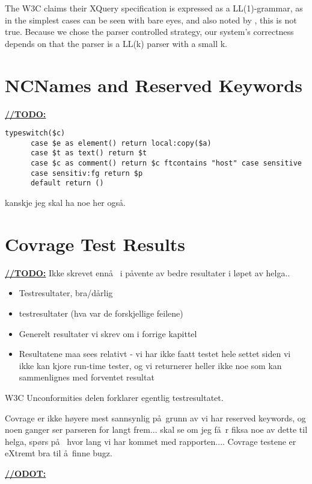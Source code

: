 The W3C claims their XQuery specification is expressed as a LL(1)-grammar\cite{createTokenizer}, as in the simplest cases can be seen with bare eyes, and also noted by \cite{kang_xquery_diglib}, this is not true. Because we chose the parser controlled strategy, our system's correctness depends on that the parser is a LL(k) parser with a small k.

\section{NCNames and Reserved Keywords}
\underline{\textbf{\LARGE //TODO:}}
\begin{verbatim}
typeswitch($c) 
      case $e as element() return local:copy($a)
      case $t as text() return $t
      case $c as comment() return $c ftcontains "host" case sensitive
      case sensitiv:fg return $p
      default return ()
\end{verbatim}


kanskje jeg skal ha noe her ogs\aa .


\section{Covrage Test Results}
\label{sect:discussion:coverageResults}
\underline{\textbf{\LARGE //TODO:}} Ikke skrevet enn\aa~ i p\aa vente av bedre resultater i l\o pet av helga..
\begin{itemize}
\item Testresultater, bra/d\aa rlig
\item testresultater (hva var de forskjellige feilene)
\item Generelt resultater vi skrev om i forrige kapittel
\item Resultatene maa sees relativt - vi har ikke faatt testet hele settet siden
vi ikke kan kjore run-time tester, og vi returnerer heller ikke noe som kan
sammenlignes med forventet resultat
\end{itemize}

W3C Unconformities delen forklarer egentlig testresultatet.

Covrage er ikke h\o yere mest sannsynlig p\aa~grunn av vi har reserved keywords, og noen ganger ser parseren for langt frem... skal se om jeg f\aa~r fiksa noe av dette til helga, sp\o rs p\aa~ hvor lang vi har kommet med rapporten.... Covrage testene er eXtremt bra til \aa~finne bugz.

\underline{\textbf{\LARGE //ODOT:}}